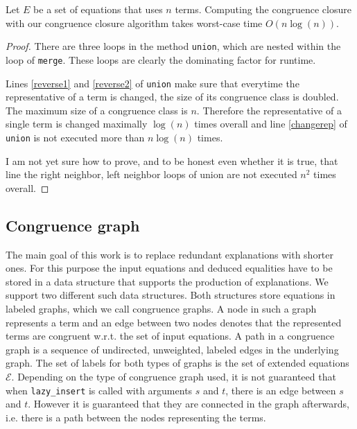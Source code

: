 \begin{proposition}[Runtime]
\label{prop:runtime}
Let $E$ be a set of equations that uses $n$ terms.
Computing the congruence closure with our congruence closure algorithm takes worst-case time $O(n \log(n))$.

\end{proposition}

\begin{proof}

There are three loops in the method \texttt{union}, which are nested within the loop of \texttt{merge}.
These loops are clearly the dominating factor for runtime.

Lines \ref{reverse1} and \ref{reverse2} of \texttt{union} make sure that everytime the representative of a term is changed, the size of its congruence class is doubled.
The maximum size of a congruence class is $n$.
Therefore the representative of a single term is changed maximally $\log(n)$ times overall and line \ref{changerep} of \texttt{union} is not executed more than $n \log(n)$ times.

{\color{blue} I am not yet sure how to prove, and to be honest even whether it is true, that line the right neighbor, left neighbor loops of union are not executed $n^2$ times overall.}

\end{proof}

\FloatBarrier

\subsection*{Congruence graph}

The main goal of this work is to replace redundant explanations with shorter ones.
For this purpose the input equations and deduced equalities have to be stored in a data structure that supports the production of explanations.
We support two different such data structures.
Both structures store equations in labeled graphs, which we call congruence graphs.
A node in such a graph represents a term and an edge between two nodes denotes that the represented terms are congruent w.r.t. the set of input equations.
A path in a congruence graph is a sequence of undirected, unweighted, labeled edges in the underlying graph.
The set of labels for both types of graphs is the set of extended equations $\mathcal{E}$.
Depending on the type of congruence graph used, it is not guaranteed that when \texttt{lazy\_insert} is called with arguments $s$ and $t$, there is an edge between $s$ and $t$.
However it is guaranteed that they are connected in the graph afterwards, i.e. there is a path between the nodes representing the terms.

